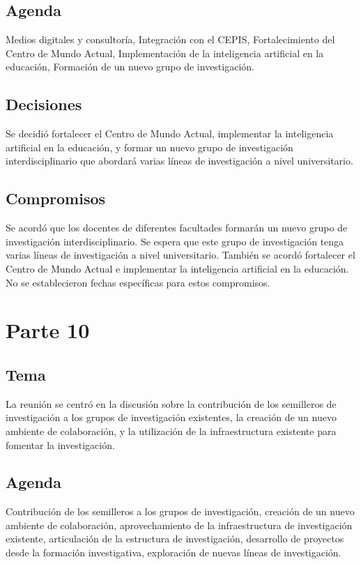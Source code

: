 \documentclass{article}
\begin{document}
\subsection{Agenda}
Medios digitales y consultoría, Integración con el CEPIS, Fortalecimiento del Centro de Mundo Actual, Implementación de la inteligencia artificial en la educación, Formación de un nuevo grupo de investigación.

\subsection{Decisiones}
Se decidió fortalecer el Centro de Mundo Actual, implementar la inteligencia artificial en la educación, y formar un nuevo grupo de investigación interdisciplinario que abordará varias líneas de investigación a nivel universitario.

\subsection{Compromisos}
Se acordó que los docentes de diferentes facultades formarán un nuevo grupo de investigación interdisciplinario. Se espera que este grupo de investigación tenga varias líneas de investigación a nivel universitario. También se acordó fortalecer el Centro de Mundo Actual e implementar la inteligencia artificial en la educación. No se establecieron fechas específicas para estos compromisos.
\section{Parte 10}
\subsection{Tema}
La reunión se centró en la discusión sobre la contribución de los semilleros de investigación a los grupos de investigación existentes, la creación de un nuevo ambiente de colaboración, y la utilización de la infraestructura existente para fomentar la investigación.

\subsection{Agenda}
Contribución de los semilleros a los grupos de investigación, creación de un nuevo ambiente de colaboración, aprovechamiento de la infraestructura de investigación existente, articulación de la estructura de investigación, desarrollo de proyectos desde la formación investigativa, exploración de nuevas líneas de investigación.
\end{document}
